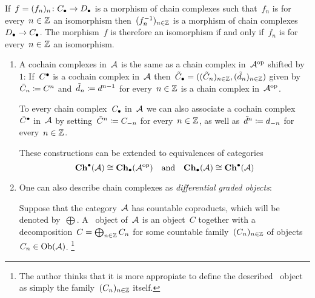 \begin{remark*}
  If~$f = (f_n)_n \colon C_\bullet \to D_\bullet$ is a morphism of chain complexes such that~$f_n$ is for every~$n \in \mathbb{Z}$ an isomorphism then~$(f_n^{-1})_{n \in \mathbb{Z}}$ is a morphism of chain complexes~$D_\bullet \to C_\bullet$.
  The morphism~$f$ is therefore an isomorphism if and only if~$f_n$ is for every~$n \in \mathbb{Z}$ an isomorphism.
\end{remark*}


\begin{remark}
  \leavevmode
  \begin{enumerate}
    \item
      A cochain complexes in~$\mathcal{A}$ is the same as a chain complex in~$\mathcal{A}^{\mathrm{op}}$ shifted by~$1$:
      If~$C^\bullet$ is a cochain complex in~$\mathcal{A}$ then~$\tilde{C}_\bullet = ( (\tilde{C}_n)_{n \in \mathbb{Z}}, (\tilde{d}_n)_{n \in \mathbb{Z}} )$ given by~$\tilde{C}_n \coloneqq C^n$ and~$\tilde{d}_n \coloneqq d^{n-1}$ for every~$n \in \mathbb{Z}$ is a chain complex in~$\mathcal{A}^{\mathrm{op}}$.
      
      To every chain complex~$C_\bullet$ in~$\mathcal{A}$ we can also associate a cochain complex~$\tilde{C}^\bullet$ in~$\mathcal{A}$ by setting~$\tilde{C}^n \coloneqq C_{-n}$ for every~$n \in \mathbb{Z}$, as well as~$\tilde{d}^n \coloneqq d_{-n}$ for every~$n \in \mathbb{Z}$.
      
      These constructions can be extended to equivalences of categories
      \[
              \mathbf{Ch}^\bullet(\mathcal{A})
        \cong \mathbf{Ch}_\bullet(\mathcal{A}^{\mathrm{op}})
        \quad\text{and}\quad
              \mathbf{Ch}_\bullet(\mathcal{A})
        \cong \mathbf{Ch}^\bullet(\mathcal{A})
      \]
    \item
      One can also describe chain complexes as \emph{differential graded objects}:
      
      Suppose that the category~$\mathcal{A}$ has countable coproducts, which will be denoted by~$\bigoplus$.
      A~ object of~$\mathcal{A}$ is an object~$C$ together with a decomposition~$C = \bigoplus_{n \in \mathbb{Z}} C_n$ for some countable family~$(C_n)_{n \in \mathbb{Z}}$ of objects~$C_n \in \operatorname{Ob}(\mathcal{A})$.%
      \footnote{The author thinks that it is more appropiate to define the described~ object as simply the family~$(C_n)_{n \in \mathbb{Z}}$ itself.}
      

\end{enumerate}
\end{remark}
